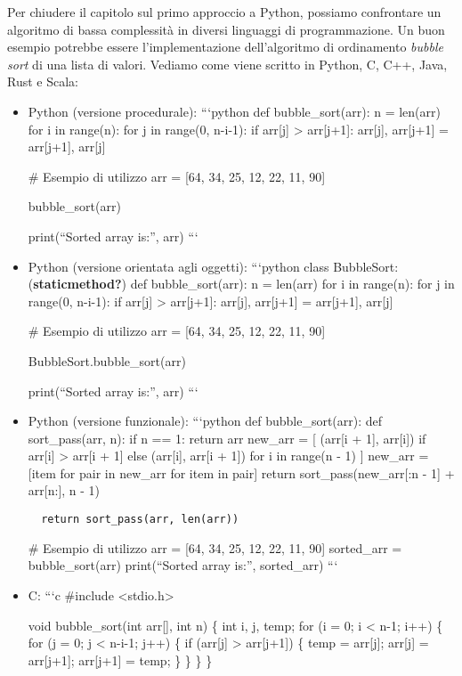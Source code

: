 \documentclass[
  letterpaper,
]{scrbook}
\begin{document}
Per chiudere il capitolo sul primo approccio a Python, possiamo
confrontare un algoritmo di bassa complessità in diversi linguaggi di
programmazione. Un buon esempio potrebbe essere l'implementazione
dell'algoritmo di ordinamento \emph{bubble sort} di una lista di valori.
Vediamo come viene scritto in Python, C, C++, Java, Rust e Scala:

\begin{itemize}
\item
  Python (versione procedurale): ```python def bubble\_sort(arr): n =
  len(arr) for i in range(n): for j in range(0, n-i-1): if arr{[}j{]}
  \textgreater{} arr{[}j+1{]}: arr{[}j{]}, arr{[}j+1{]} = arr{[}j+1{]},
  arr{[}j{]}

  \# Esempio di utilizzo arr = {[}64, 34, 25, 12, 22, 11, 90{]}

  bubble\_sort(arr)

  print(``Sorted array is:'', arr) ```
\item
  Python (versione orientata agli oggetti): ```python class BubbleSort:
  (\textbf{staticmethod?}) def bubble\_sort(arr): n = len(arr) for i in
  range(n): for j in range(0, n-i-1): if arr{[}j{]} \textgreater{}
  arr{[}j+1{]}: arr{[}j{]}, arr{[}j+1{]} = arr{[}j+1{]}, arr{[}j{]}

  \# Esempio di utilizzo arr = {[}64, 34, 25, 12, 22, 11, 90{]}

  BubbleSort.bubble\_sort(arr)

  print(``Sorted array is:'', arr) ```
\item
  Python (versione funzionale): ```python def bubble\_sort(arr): def
  sort\_pass(arr, n): if n == 1: return arr new\_arr = {[} (arr{[}i +
  1{]}, arr{[}i{]}) if arr{[}i{]} \textgreater{} arr{[}i + 1{]} else
  (arr{[}i{]}, arr{[}i + 1{]}) for i in range(n - 1) {]} new\_arr =
  {[}item for pair in new\_arr for item in pair{]} return
  sort\_pass(new\_arr{[}:n - 1{]} + arr{[}n:{]}, n - 1)

\begin{verbatim}
  return sort_pass(arr, len(arr))
\end{verbatim}

  \# Esempio di utilizzo arr = {[}64, 34, 25, 12, 22, 11, 90{]}
  sorted\_arr = bubble\_sort(arr) print(``Sorted array is:'',
  sorted\_arr) ```
\item
  C: ```c \#include \textless stdio.h\textgreater{}

  void bubble\_sort(int arr{[}{]}, int n) \{ int i, j, temp; for (i = 0;
  i \textless{} n-1; i++) \{ for (j = 0; j \textless{} n-i-1; j++) \{ if
  (arr{[}j{]} \textgreater{} arr{[}j+1{]}) \{ temp = arr{[}j{]};
  arr{[}j{]} = arr{[}j+1{]}; arr{[}j+1{]} = temp; \} \} \} \}


\end{itemize}
\end{document}
